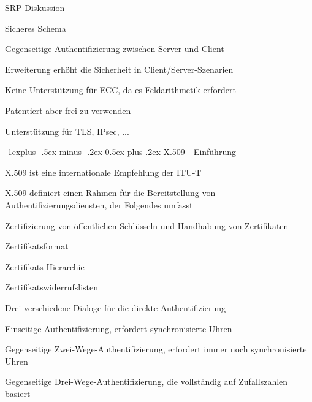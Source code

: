 \documentclass[a4paper]{article}
\makeatletter
\renewcommand{\subsection}{\@startsection{subsection}{2}{0mm}%
 {-1explus -.5ex minus -.2ex}%
 {0.5ex plus .2ex}%
 {\normalfont\normalsize\bfseries}}
\makeatother
\begin{document}
\begin{multicols}{3}
      SRP-Diskussion
      \begin{itemize*}
            \item Sicheres Schema
            \item Gegenseitige Authentifizierung zwischen Server und Client
            \item Erweiterung erhöht die Sicherheit in Client/Server-Szenarien
            \item Keine Unterstützung für ECC, da es Feldarithmetik erfordert
            \item Patentiert aber frei zu verwenden
            \item Unterstützung für TLS, IPsec, ...
      \end{itemize*}

      \subsection{X.509 - Einführung}
      \begin{itemize*}
            \item X.509 ist eine internationale Empfehlung der ITU-T %
            \item X.509 definiert einen Rahmen für die Bereitstellung von Authentifizierungsdiensten, der Folgendes umfasst
            \item Zertifizierung von öffentlichen Schlüsseln und Handhabung von Zertifikaten
            \begin{itemize*}
                  \item Zertifikatsformat
                  \item Zertifikats-Hierarchie
                  \item Zertifikatswiderrufslisten
            \end{itemize*}
            \item Drei verschiedene Dialoge für die direkte Authentifizierung
            \begin{itemize*}
                  \item Einseitige Authentifizierung, erfordert synchronisierte Uhren
                  \item Gegenseitige Zwei-Wege-Authentifizierung, erfordert immer noch synchronisierte Uhren
                  \item Gegenseitige Drei-Wege-Authentifizierung, die vollständig auf Zufallszahlen basiert
            \end{itemize*}
      \end{itemize*}


\end{multicols}
\end{document}
